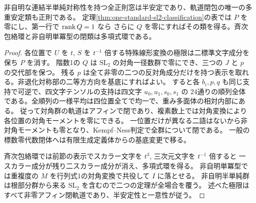 \begin{corollary}\label{cor:semisimple-symmetry-closed-limits}
非自明な連結半単純対称性を持つ全正則窓は半安定であり、軌道閉包の唯一の多重安定類も正則である。
定理\ref{thm:one-standard-sl2-classification}の表では $P$ を零にし、第一行で $\operatorname{rank} Q=1$ なら
さらに $Q$ を零にすればその類を得る。斉次包絡環と非自明単冪型の閉類は多項式環である。
\end{corollary}
\begin{proof}
各位置で $U$ を $t$, $S$ を $t^{-1}$ 倍する特殊線形変換の極限は二標準文字成分を保ち $P$ を消す。
階数1の $Q$ は $\mathrm{SL}_2$ の対角一径数群で零にでき、三つの $J$ と $p$ の交代部を保つ。
残る $p$ は全て非零の二つの反対角成分だけを持つ表示を取れる。非退化対称部の二等方方向を基底にすればよい。
すると各 $b_i,p,q$ も同じ支持で可逆で、四文字テンソルの支持は四文字 $u_0,u_1,s_0,s_1$ の
24通りの順列全体である。全順列の一様平均は四位置全てで均一で、重み多面体の相対内部にある。
従って対角群の軌道はアフィンで閉であり、複素数上では対角変換により各位置の対角モーメントを零にできる。
一位置だけが異なる二語はないから非対角モーメントも零となり、Kempf--Ness判定で全群について閉である。
一般の標数零代数閉体へは有限生成定義体からの基底変更で移る。

斉次包絡環では前節の表示でスカラー文字を $t^3$, 三次元文字を $t^{-1}$ 倍すると
一スカラー成分が残り二スカラー成分が消え、多項式環を得る。
非自明単冪型では重複度の $M$ を行列式1の対角変換で共役して $I$ に落とせる。
非自明半単純群は根部分群から来る $\mathrm{SL}_2$ を含むので二つの定理が全場合を覆う。
述べた極限はすべて非零アフィン閉軌道であり、半安定性と一意性が従う。
\end{proof}
